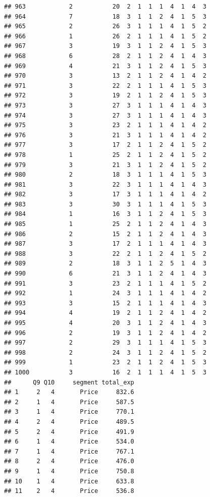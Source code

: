 \documentclass[12pt,]{krantz}
\theoremstyle{definition}
\theoremstyle{definition}
\theoremstyle{remark}
\begin{document}
\begin{verbatim}
## 963            2           20  2  1  1  1  4  1  4  3
## 964            7           18  3  1  1  2  4  1  5  3
## 965            2           26  3  1  1  1  4  1  5  2
## 966            1           26  2  1  1  1  4  1  5  2
## 967            3           19  3  1  1  2  4  1  5  3
## 968            6           28  2  1  1  2  4  1  4  3
## 969            4           21  3  1  1  2  4  1  5  3
## 970            3           13  2  1  1  2  4  1  4  2
## 971            3           22  2  1  1  1  4  1  5  3
## 972            3           19  2  1  1  2  4  1  5  3
## 973            3           27  3  1  1  1  4  1  4  3
## 974            3           27  3  1  1  1  4  1  4  3
## 975            3           23  2  1  1  1  4  1  4  2
## 976            3           21  3  1  1  1  4  1  4  2
## 977            3           17  2  1  1  2  4  1  5  2
## 978            1           25  2  1  1  2  4  1  5  2
## 979            3           21  3  1  1  2  4  1  5  2
## 980            2           18  3  1  1  1  4  1  5  3
## 981            3           22  3  1  1  1  4  1  4  3
## 982            3           17  3  1  1  1  4  1  4  2
## 983            3           30  3  1  1  1  4  1  5  3
## 984            1           16  3  1  1  2  4  1  5  3
## 985            1           25  2  1  1  2  4  1  4  3
## 986            2           15  2  1  1  2  4  1  4  3
## 987            3           17  2  1  1  1  4  1  4  3
## 988            3           22  2  1  1  2  4  1  5  2
## 989            2           18  3  1  1  2  5  1  4  3
## 990            6           21  3  1  1  2  4  1  4  3
## 991            3           23  2  1  1  1  4  1  5  2
## 992            1           24  3  1  1  1  4  1  4  2
## 993            3           15  2  1  1  1  4  1  4  3
## 994            4           19  2  1  1  2  4  1  4  2
## 995            4           20  3  1  1  2  4  1  4  3
## 996            2           19  3  1  1  2  4  1  4  2
## 997            2           29  3  1  1  1  4  1  5  3
## 998            2           24  3  1  1  2  4  1  5  2
## 999            1           23  2  1  1  2  4  1  5  3
## 1000           3           16  2  1  1  1  4  1  5  3
##      Q9 Q10     segment total_exp
## 1     2   4       Price     832.6
## 2     1   4       Price     587.5
## 3     1   4       Price     770.1
## 4     2   4       Price     489.5
## 5     2   4       Price     491.9
## 6     1   4       Price     534.0
## 7     1   4       Price     767.1
## 8     2   4       Price     476.0
## 9     1   4       Price     750.8
## 10    1   4       Price     633.8
## 11    2   4       Price     536.8

\end{verbatim}
\end{document}
